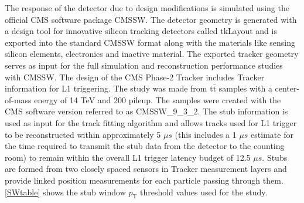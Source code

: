 The response of the detector due to design modifications is simulated using the official CMS software package CMSSW. The detector geometry is generated with a design tool for innovative silicon tracking detectors called tkLayout \cite{tkLayout} and is exported into the standard CMSSW format along with the materials like sensing silicon elements, electronics and inactive material. The exported tracker geometry serves as input for the full simulation and reconstruction performance studies with CMSSW. The design of the CMS Phase-2 Tracker includes Tracker information for L1 triggering. The study was made from t$\bar{\text{t}}$ samples with a center-of-mass energy of 14 TeV and 200 pileup. The samples were created with the CMS software version referred to as CMSSW\_9\_3\_2. The stub information is used as input for the track fitting algorithm and allows tracks used for L1 trigger to be reconstructed within approximately 5 $\mu s$ (this includes a 1 $\mu s$ estimate for the time required to transmit the stub data from the detector to the counting room) to remain within the overall L1 trigger latency budget of 12.5 $\mu s$. Stubs are formed from two closely spaced sensors in Tracker measurement layers and provide linked position measurements for each particle passing through them. \autoref{SWtable} shows the stub window $p_\text{T}$ threshold values used for the study.

